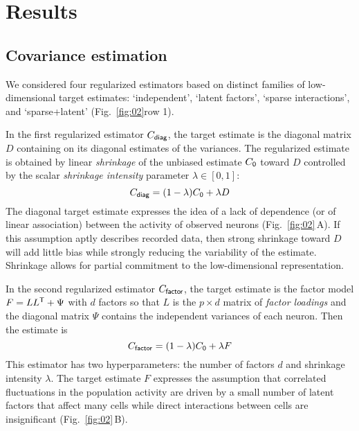 \documentclass[10pt]{article}
\newcommand{\T}{{\sf T}}
\begin{document}
\section*{Results}

\subsection*{Covariance estimation}
We considered four regularized estimators based on distinct families of low-dimensional target estimates: `independent', `latent factors', `sparse interactions', and `sparse+latent' (Fig.~\ref{fig:02}\;row 1).  

In the first regularized estimator $C_{\sf diag}$, the target estimate is the diagonal matrix $D$ containing on its diagonal estimates of the variances.
The regularized estimate is obtained by linear \emph{shrinkage} of the unbiased estimate $C_{\sf 0}$ toward $D$ controlled by the scalar \emph{shrinkage intensity} parameter $\lambda \in [0, 1]$:
\begin{equation}
C_{\sf diag} = (1-\lambda) C_{\sf 0} + \lambda D
\end{equation}
The diagonal target estimate expresses the idea of a lack of dependence (or of linear association) between the activity of observed neurons (Fig.~\ref{fig:02}\,A).  
If this assumption aptly describes recorded data, then strong shrinkage toward $D$ will add little bias while strongly reducing the variability of the estimate. Shrinkage allows for partial commitment to the low-dimensional representation.  

In the second regularized estimator $C_{\sf factor}$, the target estimate is the factor model $F =  L L^\T + \Psi$ with $d$ factors so that $L$ is the $p\times d$ matrix of \emph{factor loadings} and the diagonal matrix $\Psi$ contains the independent variances of each neuron.
Then the estimate is 
\begin{equation}
C_{\sf factor} = (1-\lambda) C_{\sf 0} + \lambda F
\end{equation}
This estimator has two hyperparameters: the number of factors $d$ and shrinkage intensity $\lambda$. The target estimate $F$ expresses the assumption that correlated fluctuations in the population activity are driven by a small number of latent factors that affect many cells while direct interactions between cells are insignificant (Fig.~\ref{fig:02}\,B).   
\end{document}
